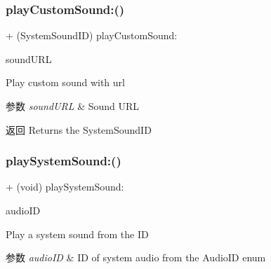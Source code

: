 \subsubsection{\texorpdfstring{play\+Custom\+Sound\+:()}{playCustomSound:()}}
{\footnotesize\ttfamily + (System\+Sound\+ID) play\+Custom\+Sound\+: \begin{DoxyParamCaption}\item[{(N\+S\+U\+RL $\ast$ \+\_\+\+Nonnull)}]{sound\+U\+RL }\end{DoxyParamCaption}}

Play custom sound with url


\begin{DoxyParams}{参数}
{\em sound\+U\+RL} & Sound U\+RL\\
\hline
\end{DoxyParams}
\begin{DoxyReturn}{返回}
Returns the System\+Sound\+ID 
\end{DoxyReturn}
\mbox{\label{interface_m_a_r_system_sound_a448d46b9614cdc1f3025f8913614f866}} 
\subsubsection{\texorpdfstring{play\+System\+Sound\+:()}{playSystemSound:()}}
{\footnotesize\ttfamily + (void) play\+System\+Sound\+: \begin{DoxyParamCaption}\item[{(M\+A\+R\+Audio\+ID)}]{audio\+ID }\end{DoxyParamCaption}}

Play a system sound from the ID


\begin{DoxyParams}{参数}
{\em audio\+ID} & ID of system audio from the Audio\+ID enum \\
\hline
\end{DoxyParams}
\mbox{\label{interface_m_a_r_system_sound_aea3446e3a4f0d2ee28fab4b35194726e}} 

